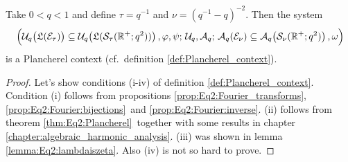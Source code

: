 

\begin{thm_sec}
Take\/ $0<q<1$ and define\/ $\tau = q^{-1}$ and\/ $\nu = (q^{-1}-q)^{-2}$. Then
the system
$$\left( \Uq\!\left(\calL(\Hcore_\tau)\vertM\right)  \subseteq
         \Uq\!\left(\calL({\mathcal S}_\tau(\RR^+;q^2)) \vertM \right),
                \varphi, \psi;  \,  \Uq, \Aq; \,
                \Aq(\Hcore_\nu) \subseteq
         \Aq\!\left({\mathcal S}_\nu(\RR^+;q^2)\vertM \right), \omega \vertL \right) $$
is a Plancherel context (cf.\ definition \ref{def:Plancherel_context}).
\end{thm_sec}

\begin{proof}
Let's show conditions (i-iv) of definition \ref{def:Plancherel_context}\@.
Condition (i) follows from propositions \ref{prop:Eq2:Fourier_transforms},
\ref{prop:Eq2:Fourier:bijections}\ and \ref{prop:Eq2:Fourier:inverse}\@.
(ii) follows from theorem \ref{thm:Eq2:Plancherel}\ together with some results in
chapter \ref{chapter:algebraic_harmonic_analysis}\@.
(iii) was shown in lemma \ref{lemma:Eq2:lambdaiszeta}\@.
Also (iv) is not so hard to prove.
\end{proof}



